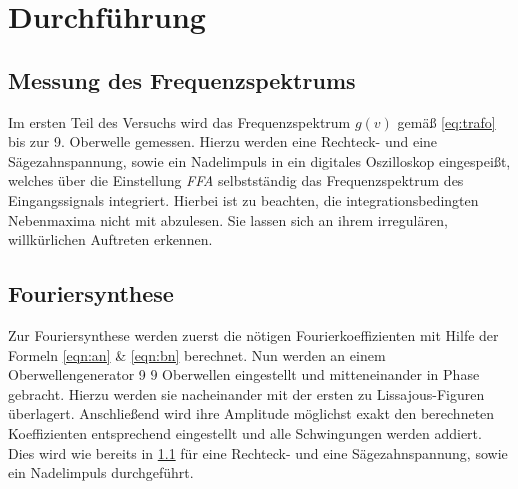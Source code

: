 \section{Durchführung}
\label{sec:Durchführung}
\subsection{Messung des Frequenzspektrums}
\label{sec:Messung}
Im ersten Teil des Versuchs wird das Frequenzspektrum $g(v)$ gemäß \eqref{eq:trafo} bis zur 9. Oberwelle gemessen. Hierzu werden eine Rechteck- und eine Sägezahnspannung, sowie ein Nadelimpuls in ein digitales Oszilloskop eingespeißt, welches über die Einstellung \textit{FFA} selbstständig das Frequenzspektrum des Eingangssignals integriert. Hierbei ist zu beachten, die integrationsbedingten Nebenmaxima nicht mit abzulesen. Sie lassen sich an ihrem irregulären, willkürlichen Auftreten erkennen.

\subsection{Fouriersynthese}
\label{sec:Synthese}
Zur Fouriersynthese werden zuerst die nötigen Fourierkoeffizienten mit Hilfe der Formeln \eqref{eqn:an} \& \eqref{eqn:bn} berechnet. Nun werden an einem Oberwellengenerator 9 $9$ Oberwellen eingestellt und mitteneinander in Phase gebracht. Hierzu werden sie nacheinander mit der ersten zu Lissajous-Figuren überlagert. Anschließend wird ihre Amplitude möglichst exakt den berechneten Koeffizienten entsprechend eingestellt und alle Schwingungen werden addiert. Dies wird wie bereits in \ref{sec:Messung} für eine Rechteck- und eine Sägezahnspannung, sowie ein Nadelimpuls durchgeführt.
